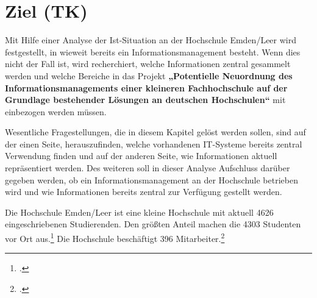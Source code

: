 \section{Ziel (TK)}
Mit Hilfe einer Analyse der Ist-Situation an der Hochschule Emden/Leer wird festgestellt, in wieweit bereits 
ein Informationsmanagement besteht. Wenn dies nicht der Fall ist, wird recherchiert, welche Informationen 
zentral gesammelt werden und welche Bereiche in das Projekt \textbf{„Potentielle Neuordnung des 
	Informationsmanagements einer kleineren Fachhochschule auf der Grundlage bestehender Lösungen an 
	deutschen Hochschulen“} mit einbezogen werden müssen.

Wesentliche Fragestellungen, die in diesem Kapitel gelöst werden sollen, sind auf der einen Seite, 
herauszufinden, welche vorhandenen IT-Systeme bereits zentral Verwendung finden und auf der anderen 
Seite, wie Informationen aktuell repräsentiert werden. Des weiteren soll in dieser Analyse Aufschluss darüber 
gegeben werden, ob ein Informationsmanagement an der Hochschule betrieben wird und wie Informationen 
bereits zentral zur Verfügung gestellt werden.

Die Hochschule Emden/Leer ist eine kleine Hochschule mit aktuell 4626 eingeschriebenen Studierenden. Den 
größten Anteil machen die 4303 Studenten vor Ort 
aus.\footcite{hsel_zeitreihe_2014} Die Hochschule beschäftigt 396 
Mitarbeiter.\footcite{hsel_zdf_2015}
